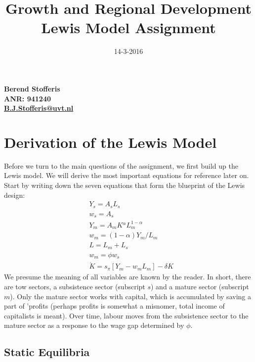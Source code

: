 \documentclass[a4paper]{article}
\title{\textbf{Growth and Regional Development}\\ Lewis Model Assignment}
\begin{document}
\date{14-3-2016}
\author{}
\maketitle
\begin{center}
\bf Berend Stofferis\\
ANR: 941240\\
\href{mailto: B.J.Stofferis@uvt.nl}{B.J.Stofferis@uvt.nl}\\
\end{center}
\thispagestyle{empty}

\newpage
\section{Derivation of the Lewis Model}
Before we turn to the main questions of the assignment, we first build up the Lewis model. We will derive the most important equations for reference later on. Start by writing down the seven equations that form the blueprint of the Lewis design:
\begin{align}
	& Y_s=A_sL_s\\
	& w_s=A_s\\
    & Y_m=A_mK{^\alpha}L_m^{1-\alpha}\\
    & w_m=(1-\alpha)Y_m/L_m\\
    & L=L_m+L_s\\
    & w_m={\phi}w_s\\
    & \dot{K}=s_{\pi}[Y_m-w_mL_m]-{\delta}K
\end{align}
We presume the meaning of all variables are known by the reader. In short, there are tow sectors, a subsistence sector (subscript $s$) and a mature sector (subscript $m$). Only the mature sector works with capital, which is accumulated by saving a part of 'profits (perhaps profits is somewhat a misnomer, total income of capitalists is meant). Over time, labour moves from the subsistence sector to the mature sector as a response to the wage gap determined by ${\phi}$.

\subsection{Static Equilibria}
\end{document}
